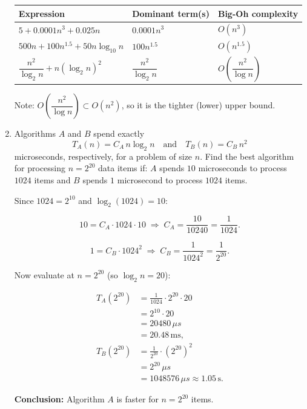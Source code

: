 \documentclass[12pt]{scrartcl}
\begin{document}
\begin{enumerate}[label=\textbf{\arabic*.}]
	      \vspace{0.4cm}
	      \begin{tabular}{|l|l|l|}
		      \hline
		      \textbf{Expression}                       & \textbf{Dominant term(s)} & \textbf{Big-Oh complexity}              \\
		      \hline
		      \(5 + 0.0001n^3 + 0.025n\)                & \(0.0001n^3\)             & \(O(n^3)\)                              \\
		      \hline
		      \(500n + 100n^{1.5} + 50n\log_{10}n\)     & \(100n^{1.5}\)            & \(O(n^{1.5})\)                          \\
		      \hline
		      \(\dfrac{n^2}{\log_2 n} + n(\log_2 n)^2\) & \(\dfrac{n^2}{\log_2 n}\) & \(O\!\left(\dfrac{n^2}{\log n}\right)\) \\
		      \hline
	      \end{tabular}

	      \vspace{0.3cm}
	      Note: \(O\!\left(\dfrac{n^2}{\log n}\right)\subset O(n^2)\), so it is the tighter (lower) upper bound.

	      \newpage
	\item
	      Algorithms \(A\) and \(B\) spend exactly
	      \[
		      T_A(n)=C_A\,n\log_2 n
		      \quad\text{and}\quad
		      T_B(n)=C_B\,n^2
	      \]
	      microseconds, respectively, for a problem of size \(n\).
	      Find the best algorithm for processing \(n=2^{20}\) data items if:
	      \(A\) spends \(10\) microseconds to process \(1024\) items and
	      \(B\) spends \(1\) microsecond to process \(1024\) items.

	      \vspace{0.3cm}
	      Since \(1024=2^{10}\) and \(\log_2(1024)=10\):

	      \[
		      10 = C_A\cdot 1024 \cdot 10 \;\Rightarrow\; C_A=\frac{10}{10240}=\frac{1}{1024}.
	      \]

	      \[
		      1 = C_B\cdot 1024^2 \;\Rightarrow\; C_B=\frac{1}{1024^2}=\frac{1}{2^{20}}.
	      \]

	      Now evaluate at \(n=2^{20}\) (so \(\log_2 n=20\)):

	      \begin{align*}
		      T_A(2^{20}) & = \frac{1}{1024}\cdot 2^{20}\cdot 20 \\
		                  & = 2^{10}\cdot 20                     \\
		                  & = 20480\,\mu s                       \\
		                  & = 20.48\,\text{ms},                  \\
		      T_B(2^{20}) & = \frac{1}{2^{20}}\cdot (2^{20})^2   \\
		                  & = 2^{20}\,\mu s                      \\
		                  & = 1048576\,\mu s
		      \approx 1.05\,\text{s}.
	      \end{align*}

	      \textbf{Conclusion:} Algorithm \(A\) is faster for \(n=2^{20}\) items.

\end{enumerate}
\end{document}
